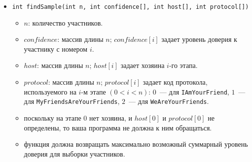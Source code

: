 \begin{itemize}
\item \texttt{int findSample(int n, int confidence[], int host[], int protocol[])}
\begin{itemize}
\item $n$: количество участников.
\item $confidence$: массив длины $n$; $confidence[i]$ задает уровень доверия к участнику с номером $i$.
\item $host$: массив длины $n$; $host[i]$ задает хозяина $i$-го этапа.
\item $protocol$: массив длины $n$; $protocol[i]$ задает код протокола, используемого на
$i$-м этапе $(0 < i < n)$: $0$~--- для \texttt{IAmYourFriend}, $1$~--- для \texttt{MyFriendsAreYourFriends}, $2$~--- для \texttt{WeAreYourFriends}.
\item поскольку на этапе $0$ нет хозяина, и $host[0]$ и $protocol[0]$ не определены, то
ваша программа не должна к ним обращаться.
\item функция должна возвращать максимально возможный суммарный уровень доверия
для выборки участников.
\end{itemize}
\end{itemize}